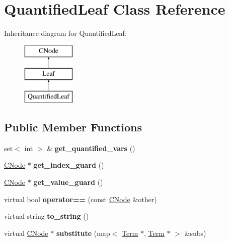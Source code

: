 \hypertarget{classQuantifiedLeaf}{\section{\-Quantified\-Leaf \-Class \-Reference}
\label{classQuantifiedLeaf}
}
\-Inheritance diagram for \-Quantified\-Leaf\-:\begin{figure}[H]
\begin{center}
\leavevmode
\includegraphics[height=3.000000cm]{classQuantifiedLeaf}
\end{center}
\end{figure}
\subsection*{\-Public \-Member \-Functions}
\begin{DoxyCompactItemize}
\item 
\hypertarget{classQuantifiedLeaf_a10affbbc61d18f065e230d4848ef2e55}{set$<$ int $>$ \& {\bfseries get\-\_\-quantified\-\_\-vars} ()}\label{classQuantifiedLeaf_a10affbbc61d18f065e230d4848ef2e55}

\item 
\hypertarget{classQuantifiedLeaf_a6aef6c1fa3451ed60857d60c77dfd94a}{\hyperlink{classCNode}{\-C\-Node} $\ast$ {\bfseries get\-\_\-index\-\_\-guard} ()}\label{classQuantifiedLeaf_a6aef6c1fa3451ed60857d60c77dfd94a}

\item 
\hypertarget{classQuantifiedLeaf_aa8b0d5eab65f9a0b2957e9eab5af6dfd}{\hyperlink{classCNode}{\-C\-Node} $\ast$ {\bfseries get\-\_\-value\-\_\-guard} ()}\label{classQuantifiedLeaf_aa8b0d5eab65f9a0b2957e9eab5af6dfd}

\item 
\hypertarget{classQuantifiedLeaf_ab46b71c4cb35fbf9ab3d31ca915423b8}{virtual bool {\bfseries operator==} (const \hyperlink{classCNode}{\-C\-Node} \&other)}\label{classQuantifiedLeaf_ab46b71c4cb35fbf9ab3d31ca915423b8}

\item 
\hypertarget{classQuantifiedLeaf_aec92f796105418177b33b169ed32c4f0}{virtual string {\bfseries to\-\_\-string} ()}\label{classQuantifiedLeaf_aec92f796105418177b33b169ed32c4f0}

\item 
\hypertarget{classQuantifiedLeaf_a56f45ca0ee111c4f8fee1c511fba1add}{virtual \hyperlink{classCNode}{\-C\-Node} $\ast$ {\bfseries substitute} (map$<$ \hyperlink{classTerm}{\-Term} $\ast$, \hyperlink{classTerm}{\-Term} $\ast$ $>$ \&subs)}\label{classQuantifiedLeaf_a56f45ca0ee111c4f8fee1c511fba1add}

\end{DoxyCompactItemize}
